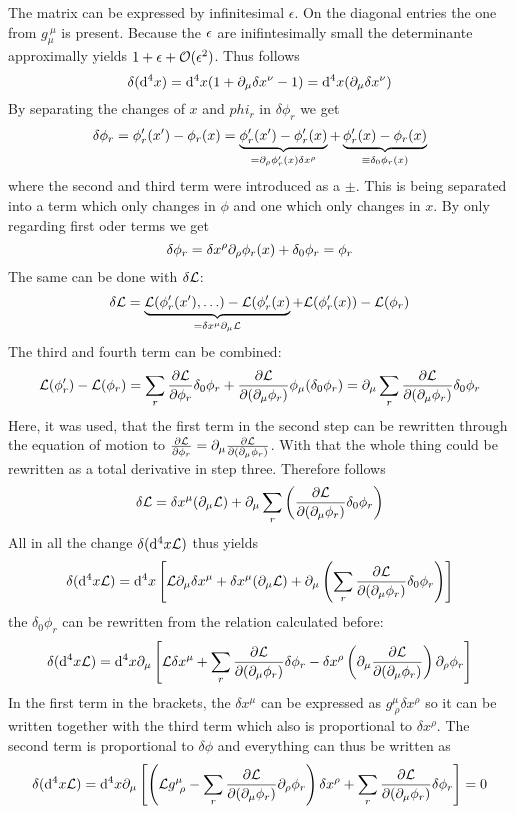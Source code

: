 The matrix can be expressed by infinitesimal $\epsilon$. On the diagonal entries the one from $g_\mu^{~\mu}$ is present. Because the $\epsilon$ are inifintesimally small the determinante approximally yields $1 + \epsilon + \mathcal{O}(\epsilon^2)$. Thus follows
\[ \delta({\rm d}^4 x) = {\rm d}^4x( 1+ \partial_\mu \delta x^\nu -1) = {\rm d}^4x( \partial_\mu \delta x^\nu)\]
By separating the changes of $x$ and $phi_r$ in $\delta \phi_r$ we get
\[ \delta \phi_r = \phi_r'(x') - \phi_r(x) = \underbrace{\phi_r'(x') - \phi_r'(x)}_{=\partial_\rho \phi'_r(x) \delta x^\rho} + \underbrace{\phi_r'(x) - \phi_r(x)}_{\equiv \delta_0 \phi_r(x)} \]
where the second and third term were introduced as a $\pm$. This is being separated into a term which only changes in $\phi$ and one which only changes in $x$. By only regarding first oder terms we get
\[ \delta \phi_r = \delta x^\rho \partial_\rho \phi_r(x) + \delta_0 \phi_r = \phi_r\]
The same can be done with $\delta \mathcal{L}$:
\[ \delta \mathcal{L} = \underbrace{ \mathcal{L}( \phi'_r(x'), \ldots) - \mathcal{L}(\phi_r'(x)}_{= \delta x^\mu \partial_\mu \mathcal{L}}+ \mathcal{L}(\phi'_r(x)) - \mathcal{L}(\phi_r) \]
The third and fourth term can be combined:
\[ \mathcal{L}(\phi_r') - \mathcal{L}(\phi_r) = \sum_r \frac{ \partial \mathcal{L}}{\partial \phi_r} \delta_0 \phi_r + \frac{\partial \mathcal{L}}{\partial (\partial_\mu \phi_r)} \phi_\mu ( \delta_0 \phi_r) = \partial_\mu \sum_r \frac{\partial \mathcal{L}}{\partial ( \partial_\mu \phi_r)} \delta_0 \phi_r\]
Here, it was used, that the first term in the second step can be rewritten through the equation of motion to $\frac{\partial \mathcal{L}}{\partial \phi_r} = \partial_\mu \frac{\partial \mathcal{L}}{\partial ( \partial_\mu \phi_r)}$. With that the whole thing could be rewritten as a total derivative in step three. Therefore follows
\[ \delta \mathcal{L} = \delta x^\mu ( \partial_\mu \mathcal{L}) + \partial_\mu \sum_r \left( \frac{\partial \mathcal{L}}{\partial( \partial_\mu \phi_r) } \delta_0 \phi_r\right)\]
All in all the change $\delta( {\rm d}^4 x \mathcal{L})$ thus yields
\[ \delta( {\rm d}^4 x\mathcal{L}) = {\rm d}^4 x \left[ \mathcal{L} \partial_\mu \delta x^\mu + \delta x^\mu ( \partial_\mu \mathcal{L}) + \partial_\mu \left( \sum_r \frac{\partial \mathcal{L}}{\partial( \partial_\mu \phi_r)} \delta_0 \phi_r \right)\right]\]
the $\delta_0 \phi_r$ can be rewritten from the relation calculated before:
\[ \delta( {\rm d}^4 x \mathcal{L}) = {\rm d}^4 x \partial_\mu\left[ \mathcal{L} \delta x^\mu + \sum_r \frac{\partial \mathcal{L}}{\partial (\partial_\mu \phi_r)} \delta\phi_r - \delta x^\rho \left( \partial_\mu \frac{\partial \mathcal{L}}{\partial ( \partial_\mu \phi_r)} \right) \partial_\rho \phi_r\right]\]
In the first term in the brackets, the $\delta x^\mu$ can be expressed as $g^\mu_{~\rho} \delta x^\rho$ so it can be written together with the third term which also is proportional to $\delta x^\rho$. The second term is proportional to $\delta \phi$ and everything can thus be written as
\[ \delta( {\rm d}^4 x \mathcal{L}) = {\rm d}^4x \partial_\mu \left[ \left( \mathcal{L} g^\mu _{~\rho} - \sum_r \frac{\partial \mathcal{L}}{\partial ( \partial_\mu \phi_r)} \partial_\rho \phi_r \right) \delta x^\rho + \sum_r \frac{\partial \mathcal{L}}{\partial ( \partial_\mu \phi_r)} \delta \phi_r \right]  = 0\]

